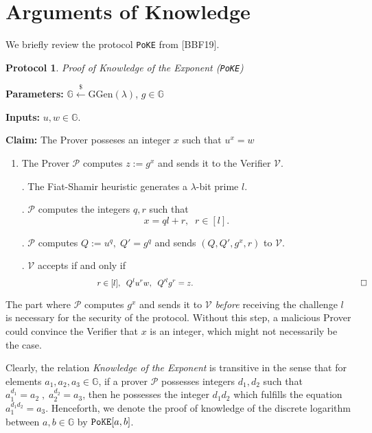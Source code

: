 \documentclass[11pt, lettersize, notitlepage, leqno, footskip=0.6cm]{article}
\newcommand{\mc}{\mathcal}
\newcommand{\mb}{\mathbb}
\newcommand{\mr}{\mathrm}
\newcommand{\lamb}{\lambda}
\newcommand{\mP}{\mc{P}}
\newcommand{\vs}{\vspace{-0.15cm}}
\newtheorem{Prot}[Thm]{Protocol}
\numberwithin{equation}{section}
\begin{document}
\section{\fontsize{12}{12}\selectfont Arguments of Knowledge  }

\noindent We briefly review the protocol \verb|PoKE| from [BBF19]. 

\begin{Prot} \normalfont \textit{Proof of Knowledge of the Exponent} (\verb|PoKE|) \end{Prot} \vspace{-0.3cm}

\noindent \textbf{Parameters:} $\mb{G}\xleftarrow{\$} \mr{GGen}(\lamb)$,\; $g\in \mb{G}$

\noindent \textbf{Inputs:} $u, w \in \mb{G}$.

\noindent \textbf{Claim:} The Prover posseses an integer $x$ such that $u^x = w$

\begin{enumerate}[wide, labelwidth=!, labelindent=0pt]\vs \item The Prover $\mc{P}$ computes $z:= g^x$ and sends it to the Verifier $\mc{V}$.

. The Fiat-Shamir heuristic generates a $\lamb$-bit prime $l$.

. $\mc{P}$ computes the integers $q, r$ such that  \vspace{-0.15cm}$$x = ql+r,\;\; r\in [l].$$

. $\mc{P}$ computes $Q:= u^q,\; Q' = g^q$ and sends $(Q, Q', g^x, r)$ to $\mc{V}$.

. $\mc{V}$ accepts if and only if \vspace{-0.15cm}$$\;\;\;\;\;\;\;\;\;\;\;\;\;\;\;\;\;\;\;\;\;\;\;\;\;\;\;\;\;\;\;\;\;r\in [l],\;\; Q^lu^r w,\;\; Q'^lg^r = z. \;\;\;\;\;\;\;\;\;\;\;\;\;\;\;\;\;\;\;\;\;\;\;\;\;\;\;\;\;\;\;\;\;\;\;\;\;\;\;\;\;\;\;\;\;\;\;\;\;\;\;\;\;\;\;\;\;\;\;\;\;\;\;\;\;\;\;\qed$$ \end{enumerate}

The part where $\mc{P}$ computes $g^x$ and sends it to $\mc{V}$ \textit{before} receiving the challenge $l$ is necessary for the security of the protocol. Without this step, a malicious Prover could convince the Verifier that $x$ is an integer, which might not necessarily be the case.

Clearly, the relation \textit{Knowledge of the Exponent} is transitive in the sense that for elements $a_1,a_2,a_3\in\mb{G}$, if a prover $\mP$ possesses integers $d_1,d_2$ such that $a_1^{d_1} = a_2\;,\;a_2^{d_2} = a_3$, then he possesses the integer $d_1d_2$ which fulfills the equation $a_1^{d_1d_2} = a_3$. Henceforth, we denote the proof of knowledge of the discrete logarithm between $a,b\in\mb{G}$ by $\verb|PoKE|[a,b]$. 
\end{document}
